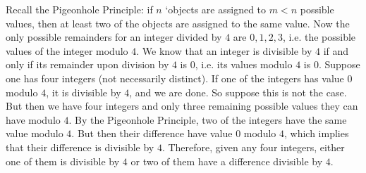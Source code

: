 \documentclass[11pt,letterpaper]{article}
\begin{document}
\sol Recall the Pigeonhole Principle: if $n$ `objects are assigned to $m < n$ possible values, then at least two of the objects are assigned to the same value. Now the only possible remainders for an integer divided by $4$ are $0, 1, 2, 3$, i.e. the possible values of the integer modulo $4$. We know that an integer is divisible by $4$ if and only if its remainder upon division by $4$ is $0$, i.e. its values modulo $4$ is $0$. Suppose one has four integers (not necessarily distinct). If one of the integers has value $0$ modulo $4$, it is divisible by $4$, and we are done. So suppose this is not the case. But then we have four integers and only three remaining possible values they can have modulo $4$. By the Pigeonhole Principle, two of the integers have the same value modulo $4$. But then their difference have value $0$ modulo $4$, which implies that their difference is divisible by $4$. Therefore, given any four integers, either one of them is divisible by $4$ or two of them have a difference divisible by $4$. 
\end{document}
